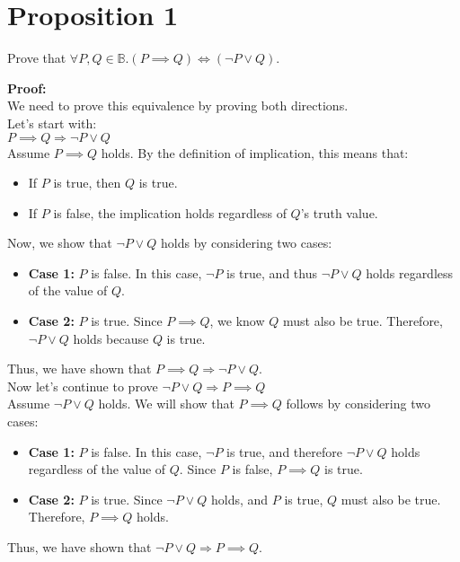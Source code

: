 \documentclass[12 pt]{article}
\begin{document}
\section*{Proposition 1}	

Prove that $\forall P, Q \in \mathbb{B}.(P \implies Q) \iff (\neg P \lor Q)$.

\noindent\textbf{Proof:} \\[10pt]
We need to prove this equivalence by proving both directions. \\
Let's start with: \\
\( P \implies Q \Rightarrow \neg P \lor Q \) \\
Assume \( P \implies Q \) holds. By the definition of implication, this means that:
\begin{itemize}
    \item If \( P \) is true, then \( Q \) is true.
    \item If \( P \) is false, the implication holds regardless of \( Q \)'s truth value.
\end{itemize}
Now, we show that \( \neg P \lor Q \) holds by considering two cases:
\begin{itemize}
    \item \textbf{Case 1:} \( P \) is false. In this case, \( \neg P \) is true, and thus \( \neg P \lor Q \) holds regardless of the value of \( Q \).
    \item \textbf{Case 2:} \( P \) is true. Since \( P \implies Q \), we know \( Q \) must also be true. Therefore, \( \neg P \lor Q \) holds because \( Q \) is true.
\end{itemize}
Thus, we have shown that \( P \implies Q \Rightarrow \neg P \lor Q \). \\
Now let's continue to prove \( \neg P \lor Q \Rightarrow P \implies Q \) \\
Assume \( \neg P \lor Q \) holds. We will show that \( P \implies Q \) follows by considering two cases:
\begin{itemize}
    \item \textbf{Case 1:} \( P \) is false. In this case, \( \neg P \) is true, and therefore \( \neg P \lor Q \) holds regardless of the value of \( Q \). Since \( P \) is false, \( P \implies Q \) is true.
    \item \textbf{Case 2:} \( P \) is true. Since \( \neg P \lor Q \) holds, and \( P \) is true, \( Q \) must also be true. Therefore, \( P \implies Q \) holds.
\end{itemize}
Thus, we have shown that \( \neg P \lor Q \Rightarrow P \implies Q \).
\end{document}
